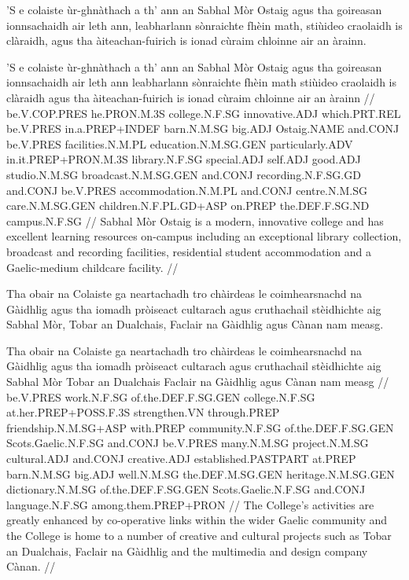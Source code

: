 \documentclass[a4paper,10pt]{article}
\begin{document}
\ex
\begingl
\glpre 'S e colaiste ùr-ghnàthach a th' ann an Sabhal Mòr Ostaig agus tha goireasan ionnsachaidh air leth ann, leabharlann sònraichte fhèin math, stiùideo craolaidh is clàraidh, agus tha àiteachan-fuirich is ionad cùraim chloinne air an àrainn. 

\vspace{4mm}
\gla 'S e colaiste ùr-ghnàthach a th' {ann an} Sabhal Mòr Ostaig agus tha goireasan ionnsachaidh {air leth} ann leabharlann sònraichte fhèin math stiùideo craolaidh is clàraidh agus tha àiteachan-fuirich is ionad cùraim chloinne air an àrainn  //
\glb be.V.COP.PRES he.PRON.M.3S college.N.F.SG innovative.ADJ which.PRT.REL be.V.PRES in.a.PREP+INDEF barn.N.M.SG big.ADJ Ostaig.NAME and.CONJ be.V.PRES facilities.N.M.PL education.N.M.SG.GEN particularly.ADV in.it.PREP+PRON.M.3S library.N.F.SG special.ADJ self.ADJ good.ADJ studio.N.M.SG broadcast.N.M.SG.GEN and.CONJ recording.N.F.SG.GD and.CONJ be.V.PRES accommodation.N.M.PL and.CONJ centre.N.M.SG care.N.M.SG.GEN children.N.F.PL.GD+ASP on.PREP the.DEF.F.SG.ND campus.N.F.SG  //
\glft Sabhal Mòr Ostaig is a modern, innovative college and has excellent learning resources on-campus including an exceptional library collection, broadcast and recording facilities, residential student accommodation and a Gaelic-medium childcare facility. //
\endgl
\xe

\ex
\begingl
\glpre Tha obair na Colaiste ga neartachadh tro chàirdeas le coimhearsnachd na Gàidhlig agus tha iomadh pròiseact cultarach agus cruthachail stèidhichte aig Sabhal Mòr, Tobar an Dualchais, Faclair na Gàidhlig agus Cànan nam measg. 

\vspace{4mm}
\gla Tha obair na Colaiste ga neartachadh tro chàirdeas le coimhearsnachd na Gàidhlig agus tha iomadh pròiseact cultarach agus cruthachail stèidhichte aig Sabhal Mòr Tobar an Dualchais Faclair na Gàidhlig agus Cànan {nam measg}  //
\glb be.V.PRES work.N.F.SG of.the.DEF.F.SG.GEN college.N.F.SG at.her.PREP+POSS.F.3S strengthen.VN through.PREP friendship.N.M.SG+ASP with.PREP community.N.F.SG of.the.DEF.F.SG.GEN Scots.Gaelic.N.F.SG and.CONJ be.V.PRES many.N.M.SG project.N.M.SG cultural.ADJ and.CONJ creative.ADJ established.PASTPART at.PREP barn.N.M.SG big.ADJ well.N.M.SG the.DEF.M.SG.GEN heritage.N.M.SG.GEN dictionary.N.M.SG of.the.DEF.F.SG.GEN Scots.Gaelic.N.F.SG and.CONJ language.N.F.SG among.them.PREP+PRON  //
\glft The College's activities are greatly enhanced by co-operative links within the wider Gaelic community and the College is home to a number of creative and cultural projects such as Tobar an Dualchais, Faclair na Gàidhlig and the multimedia and design company Cànan. //
\endgl
\xe
\end{document}

